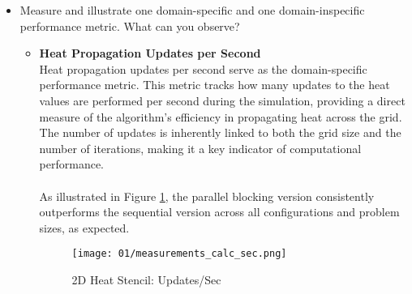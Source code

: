 \documentclass[UTF-8]{article}
\begin{document}
\begin{itemize}
    	\item Measure and illustrate one domain-specific and one domain-inspecific performance 
            metric. What can you observe?
            \begin{itemize}
                \item \textbf{Heat Propagation Updates per Second}\\
                Heat propagation updates per second serve as the domain-specific performance metric. This metric tracks how many updates to the heat values are performed per second during the simulation, providing a direct measure of the algorithm's efficiency in propagating heat across the grid. The number of updates is inherently linked to both the grid size and the number of iterations, making it a key indicator of computational performance.\\\\
                As illustrated in Figure \ref{fig:01_measurements_calc_sec}, the parallel blocking version consistently outperforms the sequential version across all configurations and problem sizes, as expected.
                \begin{figure}[H]
                    \centering
                    \texttt{[image: 01/measurements\_calc\_sec.png]}
                    \caption{2D Heat Stencil: Updates/Sec}
                    \label{fig:01_measurements_calc_sec}
                \end{figure}
                

\end{itemize}
\end{itemize}
\end{document}
